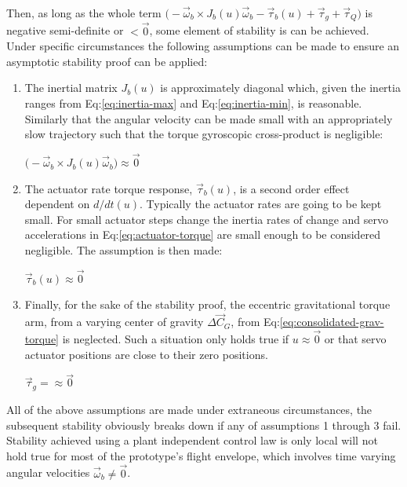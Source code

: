 Then, as long as the whole term $\big(-\vec{\omega}_b\times J_b(u)\vec{\omega}_b-\vec{\tau}_b(u)+\vec{\tau}_g+\vec{\tau}_Q\big)$ is negative semi-definite or $<\vec{0}$, some element of stability is can be achieved. Under specific circumstances the following assumptions can be made to ensure an asymptotic stability proof can be applied:
\vspace{-10pt}
\begin{enumerate}[itemsep=0em]
\item The inertial matrix $J_b(u)$ is approximately diagonal which, given the inertia ranges from Eq:\ref{eq:inertia-max} and Eq:\ref{eq:inertia-min}, is reasonable. Similarly that the angular velocity can be made small with an appropriately slow trajectory such that the torque gyroscopic cross-product is negligible:
\begin{center}
\vspace{-10pt}
$\big(-\vec{\omega}_b\times J_b(u)\vec{\omega}_b\big)\approx\vec{0}$
\vspace{-8pt}
\end{center}
\item The actuator rate torque response, $\vec{\tau}_b(u)$, is a second order effect dependent on $d/dt(u)$. Typically the actuator rates are going to be kept small. For small actuator steps change the inertia rates of change and servo accelerations in Eq:\ref{eq:actuator-torque} are small enough to be considered negligible. The assumption is then made:
\begin{center}
\vspace{-10pt}
$\vec{\tau}_b(u)\approx\vec{0}$
\vspace{-8pt}
\end{center}
\item Finally, for the sake of the stability proof, the eccentric gravitational torque arm, from a varying center of gravity $\Delta\vec{C}_G$, from Eq:\ref{eq:consolidated-grav-torque} is neglected. Such a situation only holds true if $u\approx\vec{0}$ or that servo actuator positions are close to their zero positions.
\begin{center}
\vspace{-10pt}
$\vec{\tau}_g=\approx\vec{0}$
\vspace{-8pt}
\end{center}
\end{enumerate}
All of the above assumptions are made under extraneous circumstances, the subsequent stability obviously breaks down if any of assumptions 1 through 3 fail. Stability achieved using a plant independent control law is only local will not hold true for most of the prototype's flight envelope, which involves time varying angular velocities $\vec{\omega}_b\not = \vec{0}$. 
